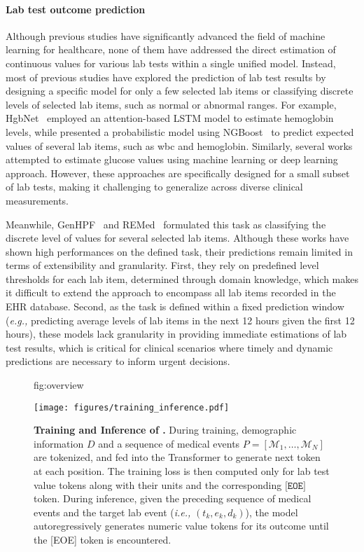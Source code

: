 \paragraph{Lab test outcome prediction}
Although previous studies have significantly advanced the field of machine learning for healthcare, none of them have addressed the direct estimation of continuous values for various lab tests within a single unified model.
Instead, most of previous studies have explored the prediction of lab test results by designing a specific model for only a few selected lab items or classifying discrete levels of selected lab items, such as normal or abnormal ranges.
For example, HgbNet~\citep{zhi2024hgbnet} employed an attention-based LSTM model to estimate hemoglobin levels, while \citet{jiang2024probabilistic} presented a probabilistic model using NGBoost~\citep{duan2020ngboost} to predict expected values of several lab items, such as wbc and hemoglobin.
Similarly, several works~\citep{liu2023machine,fu2023implementation,langarica2024deep} attempted to estimate glucose values using machine learning or deep learning approach.
However, these approaches are specifically designed for a small subset of lab tests, making it challenging to generalize across diverse clinical measurements.

Meanwhile, GenHPF~\citep{hur2023genhpf} and REMed~\citep{kim2023general} formulated this task as classifying the discrete level of values for several selected lab items.
Although these works have shown high performances on the defined task, their predictions remain limited in terms of extensibility and granularity.
First, they rely on predefined level thresholds for each lab item, determined through domain knowledge, which makes it difficult to extend the approach to encompass all lab items recorded in the EHR database.
Second, as the task is defined within a fixed prediction window (\textit{e.g.,} predicting average levels of lab items in the next 12 hours given the first 12 hours), these models lack granularity in providing immediate estimations of lab test results, which is critical for clinical scenarios where timely and dynamic predictions are necessary to inform urgent decisions.

\begin{figure*}[ht] %
\floatconts
    {fig:overview}
    {\vspace{-8mm}
    \caption{\textbf{Training and Inference of \ours{}.} During training, demographic information $D$ and a sequence of medical events $P=[\mathcal{M}_1,\dotsc,\mathcal{M}_N]$ are tokenized, and fed into the Transformer to generate next token at each position. The training loss is then computed only for lab test value tokens along with their units and the corresponding $\texttt{[EOE]}$ token. During inference, given the preceding sequence of medical events and the target lab event (\textit{i.e.,} $(t_k,e_k,d_k)$), the model autoregressively generates numeric value tokens for its outcome until the [EOE] token is encountered.}}
    {
        \texttt{[image: figures/training\_inference.pdf]}
    }
    \vspace{-6mm}
\end{figure*}